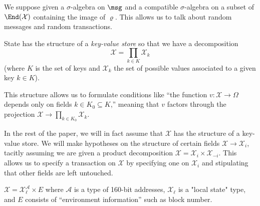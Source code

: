 \documentclass[a4paper,11pt]{article}
\begin{document}
We suppose given a $\sigma$-algebra on $\msg$ and a compatible $\sigma$-algebra on a subset of $\End(\mathcal{X})$ containing the image of $\varrho$.
%
This allows us to talk about random messages and random transactions.

\begin{example}

  State has the structure of a \emph{key-value store} so that we have a decomposition
  \[
    \mathcal{X} = \prod_{k\in K}\mathcal{X}_k
  \]
  (where $K$ is the set of keys and $\mathcal{X}_k$ the set of possible values associated to a given key $k\in K$).
  
  This structure allows us to formulate conditions like ``the function $v:\mathcal{X}\rightarrow \Omega$ depends only on fields $k\in K_0\subseteq K$,'' meaning that $v$ factors through the projection $\mathcal{X}\rightarrow\prod_{k\in K_0}\mathcal{X}_k$.
  
\end{example}

In the rest of the paper, we will in fact assume that $\mathcal{X}$ has the structure of a key-value store. We will make hypotheses on the structure of certain fields $\mathcal{X}\rightarrow\mathcal{X}_i$, tacitly assuming we are given a product decomposition $\mathcal{X}=\mathcal{X}_i \times \mathcal{X}_{-i}$. This allows us to specify a transaction on $\mathcal{X}$ by specifying one on $\mathcal{X}_i$ and stipulating that other fields are left untouched. 


\begin{example}
\label{accounts-model}
  
  $\mathcal{X} = \mathcal{X}_\ell^\mathcal{A} \times E$ where $\mathcal A$ is a type of 160-bit addresses, $\mathcal{X}_\ell$ is a "local state" type, and $E$ consists of ``environment information'' such as block number.
  
\end{example}
\end{document}
